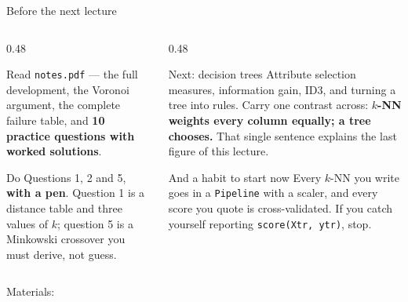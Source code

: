 \documentclass[aspectratio=169]{beamer}
\begin{document}
\begin{frame}[shrink=3]{Before the next lecture}
  \begin{columns}[T]
    \begin{column}{0.48\textwidth}
      \begin{block}{Read}
        \texttt{notes.pdf} --- the full development, the Voronoi argument, the
        complete failure table, and \textbf{10 practice questions with worked
        solutions}.
      \end{block}
      \begin{block}{Do}
        Questions 1, 2 and 5, \textbf{with a pen}. Question 1 is a distance
        table and three values of $k$; question 5 is a Minkowski crossover you
        must derive, not guess.
      \end{block}
    \end{column}
    \begin{column}{0.48\textwidth}
      \begin{exampleblock}{Next: decision trees}
        Attribute selection measures, information gain, ID3, and turning a
        tree into rules. Carry one contrast across: \textbf{$k$-NN weights
        every column equally; a tree chooses.} That single sentence explains
        the last figure of this lecture.
      \end{exampleblock}
      \begin{alertblock}{And a habit to start now}
        Every $k$-NN you write goes in a \texttt{Pipeline} with a scaler, and
        every score you quote is cross-validated. If you catch yourself
        reporting \texttt{score(Xtr, ytr)}, stop.
      \end{alertblock}
    \end{column}
  \end{columns}
  \begin{center}
    \small Materials: \texttt{\AMLRepoURL}
  \end{center}
  \slidesources{\AMLUnitVISources}
\end{frame}
\end{document}
